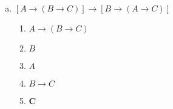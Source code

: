 \documentclass[a4paper, 12pt, addpoints]{exam}
\begin{document}
\begin{questions}
\begin{resp}
\begin{enumerate}[a)]
\begin{multicols}{2}
        \begin{enumerate}[1.]
          \item $A \rightarrow B$
          \item $B \rightarrow (C \rightarrow D)$
          \item $A \rightarrow (B \rightarrow C)$
          \item $A$
          \item $B$
          \item $B \rightarrow C$
          \item $C$
          \item $C \rightarrow D$
          \item $\boldsymbol{D}$
        \end{enumerate}
        
        \columnbreak

        \begin{enumerate}[\ding{32}]
          \item (hip)
          \item (hip)
          \item (hip)
          \item (hip)
          \item (1, 4, modus ponens)
          \item (3, 4, modus ponens)
          \item (5, 6, modus ponens)
          \item (2, 5, modus ponens)
          \item \textbf{(7, 8, modus ponens)} 
        \end{enumerate}

      \end{multicols}

      \item $[A \rightarrow (B \rightarrow C)] \rightarrow [B \rightarrow (A \rightarrow C)]$ \\
      \begin{multicols}{2}

        \begin{enumerate}[1.]
          \item $A \rightarrow (B \rightarrow C)$
          \item $B$
          \item $A$
          \item $B \rightarrow C$
          \item $\boldsymbol{C}$
        \end{enumerate}
        

\end{multicols}
\end{enumerate}
\end{resp}
\end{questions}
\end{document}
